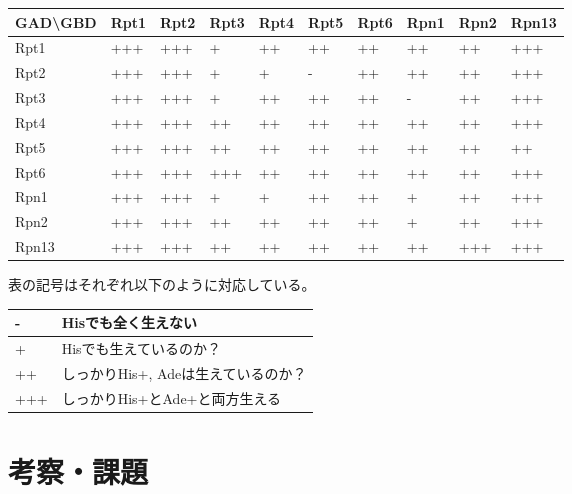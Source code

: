 \documentclass[a4paper,papersize,dvipdfmx]{jsarticle}
\begin{document}
\begin{table}[H]
  \centering
\begin{tabular}{|l|l|l|l|l|l|l|l|l|l|}
\hline
GAD\textbackslash{}GBD & Rpt1 & Rpt2 & Rpt3 & Rpt4 & Rpt5 & Rpt6 & Rpn1 & Rpn2 & Rpn13 \\ \hline
Rpt1                   & +++  & +++  & +   & ++   & ++   & ++   & ++   & ++   & +++   \\ \hline
Rpt2                   & +++  & +++  & +    & +    & -    & ++   & ++   & ++   & +++   \\ \hline
Rpt3                   & +++  & +++  & +   & ++   & ++  & ++   & -    & ++   & +++   \\ \hline
Rpt4                   & +++  & +++  & ++   & ++   & ++   & ++   & ++   & ++   & +++   \\ \hline
Rpt5                   & +++  & +++  & ++   & ++   & ++   & ++   & ++   & ++   & ++   \\ \hline
Rpt6                   & +++  & +++  & +++  & ++   & ++   & ++   & ++  & ++   & +++   \\ \hline
Rpn1                   & +++  & +++  & +    & +   & ++  & ++  & +    & ++   & +++   \\ \hline
Rpn2                   & +++  & +++  & ++   & ++   & ++   & ++   & +    & ++   & +++   \\ \hline
Rpn13                  & +++  & +++  & ++   & ++   & ++   & ++   & ++   & +++  & +++   \\ \hline
\end{tabular}
\end{table}

表の記号はそれぞれ以下のように対応している。

\begin{table}[H]
  \centering
\begin{tabular}{|l|l|}
\hline
-   & Hisでも全く生えない            \\ \hline
+   & Hisでも生えているのか？          \\ \hline
++  & しっかりHis+, Adeは生えているのか？ \\ \hline
+++ & しっかりHis+とAde+と両方生える    \\ \hline
\end{tabular}
\end{table}

\section*{考察・課題}
\end{document}
